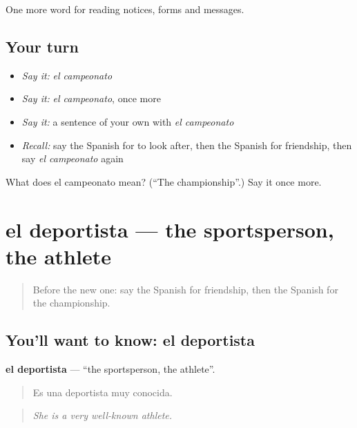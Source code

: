 \begin{grammarlens}[title={What you've built}]
One more word for reading notices, forms and messages.
\end{grammarlens}

\subsection*{Your turn}
\begin{itemize}
\raggedright
  \item \emph{Say it:} \emph{el campeonato}
  \item \emph{Say it:} \emph{el campeonato}, once more
  \item \emph{Say it:} a sentence of your own with \emph{el campeonato}
  \item \emph{Recall:} say the Spanish for to look after, then the Spanish for friendship, then say \emph{el campeonato} again
\end{itemize}

\begin{tcolorbox}[breakable,colback=teal!4,colframe=teal!35!black,title={Before you move on}]
What does el campeonato mean? (\textquotedblleft{}The championship\textquotedblright{}.) Say it once more.
\end{tcolorbox}
\section[el deportista]{el deportista — the sportsperson, the athlete}

\label{lesson:ES-C498-deportista}



\begin{quote}
Before the new one: say the Spanish for friendship, then the Spanish for the championship.
\end{quote}

\subsection*{You'll want to know: el deportista}
\textbf{el deportista} — \textquotedblleft{}the sportsperson, the athlete\textquotedblright{}.

\begin{quote}
Es una deportista muy conocida.
\end{quote}

\begin{quote}
\emph{She is a very well-known athlete.}
\end{quote}

